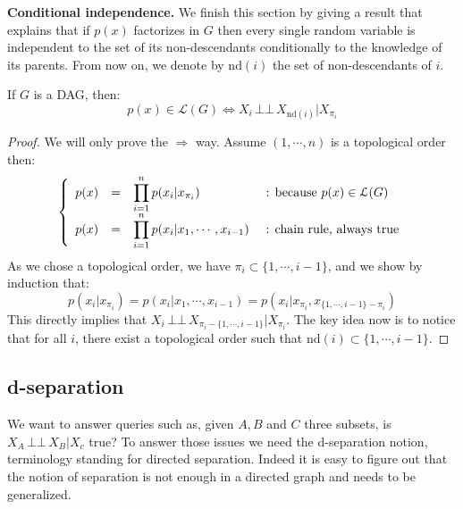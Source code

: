 \documentclass[12pt]{report}
\newcommand{\indep}{\ensuremath{\,\bot\!\!\!\bot\,}} %
\begin{document}
\textbf{Conditional independence. }We finish this section by giving a result that explains that if $p(x)$ factorizes in $G$ then every single random variable is independent to the set of its non-descendants conditionally to the knowledge of its parents. From now on, we denote by $\text{nd}(i)$ the set of non-descendants of $i$.

\begin{proposition}
If $G$ is a DAG, then: 
\begin{equation}
p(x) \in \mathcal{L}(G) \Leftrightarrow X_i \indep X_{\text{nd}(i)} | X_{\pi_i}
\end{equation}
\end{proposition}
\begin{proof}
We will only prove the $\Rightarrow$ way. Assume $(1,\cdots, n)$ is a topological order then: 
\begin{equation*}
\left\{
\begin{array}{r l l l}
p(x) & = & \displaystyle \prod_{i=1}^n p(x_i | x_{\pi_i}) & \text{ : because $p(x)\in\mathcal{L}(G)$} \\
p(x) & = & \displaystyle \prod_{i=1}^n p(x_i | x_1, \cdots, x_{i-1}) & \text{ : chain rule, always true} \\
\end{array}
\right.
\end{equation*}
As we chose a topological order, we have $\pi_i \subset \{1, \cdots, i-1 \}$, and we show by induction that:
\begin{equation*}
p(x_i | x_{\pi_i}) = p(x_i | x_1, \cdots, x_{i-1}) = p(x_i | x_{\pi_i}, x_{\{ 1,\cdots, i-1\} - \pi_i})
\end{equation*}
This directly implies that $X_i \indep X_{\pi_i - \{ 1,\cdots, i-1\}} | X_{\pi_i}$. The key idea now is to notice that for all $i$, there exist a topological order such that $\text{nd}(i) \subset \{1,\cdots, i-1\}$.
\end{proof}




\subsection{d-separation}

We want to answer queries such as, given $A, B$ and $C$ three subsets, is $X_A \indep X_B | X_c$ true? To answer those issues we need the d-separation notion, terminology standing for directed separation. Indeed it is easy to figure out that the notion of separation is not enough in a directed graph and needs to be generalized. 
\end{document}
